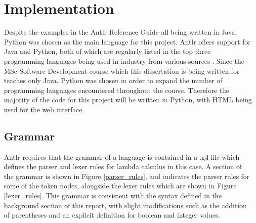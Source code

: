 \documentclass[a4paper,11pt]{report}
\begin{document}
\section{Implementation}

Despite the examples in the Antlr Reference Guide \cite{Parr2012} all being written in Java, Python was chosen as the main language for this project. Antlr offers support for Java and Python, both of which are regularly listed in the top three programming languages being used in industry from various sources \cite{ProgLang1}\cite{ProgLang2}\cite{ProgLang3}. Since the MSc Software Development course which this dissertation is being written for teaches only Java, Python was chosen in order to expand the number of programming languages encountered throughout the course. Therefore the majority of the code for this project will be written in Python, with HTML being used for the web interface.

\subsection{Grammar}

Antlr requires that the grammar of a language is contained in a .g4 file which defines the parser and lexer rules for lambda calculus in this case. A section of the grammar is shown in Figure \ref{parser_rules}, and indicates the parser rules for some of the token nodes, alongside the lexer rules which are shown in Figure \ref{lexer_rules}. This grammar is consistent with the syntax defined in the background section of this report, with slight modifications such as the addition of parentheses and an explicit definition for boolean and integer values.
\end{document}
